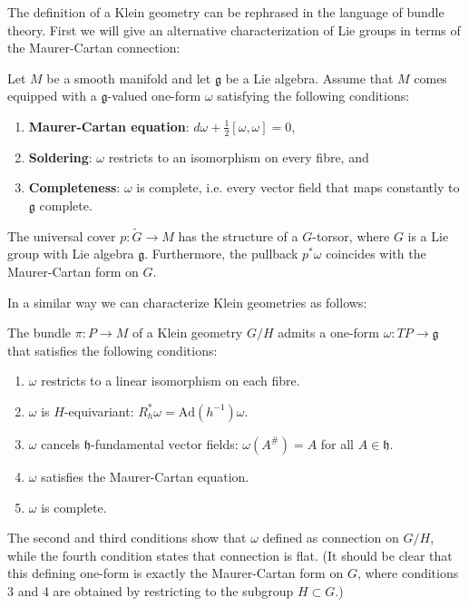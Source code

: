     The definition of a Klein geometry can be rephrased in the language of bundle theory. First we will give an alternative characterization of Lie groups in terms of the Maurer-Cartan connection:
    \begin{property}
        Let $M$ be a smooth manifold and let $\mathfrak{g}$ be a Lie algebra. Assume that $M$ comes equipped with a $\mathfrak{g}$-valued one-form $\omega$ satisfying the following conditions:
        \begin{enumerate}
            \item \textbf{Maurer-Cartan equation}: $d\omega + \frac{1}{2}[\omega,\omega]=0$,
            \item \textbf{Soldering}: $\omega$ restricts to an isomorphism on every fibre, and
            \item \textbf{Completeness}: $\omega$ is complete, i.e. every vector field that maps constantly to $\mathfrak{g}$ complete.
        \end{enumerate}
        The universal cover $p:\widetilde{G}\rightarrow M$ has the structure of a $G$-torsor, where $G$ is a Lie group with Lie algebra $\mathfrak{g}$. Furthermore, the pullback $p^*\omega$ coincides with the Maurer-Cartan form on $G$.
    \end{property}

    In a similar way we can characterize Klein geometries as follows:
    \begin{property}
        The bundle $\pi:P\rightarrow M$ of a Klein geometry $G/H$ admits a one-form $\omega:TP\rightarrow\mathfrak{g}$ that satisfies the following conditions:
        \begin{enumerate}
            \item $\omega$ restricts to a linear isomorphism on each fibre.
            \item $\omega$ is $H$-equivariant: $R_h^*\omega = \text{Ad}(h^{-1})\omega$.
            \item $\omega$ cancels $\mathfrak{h}$-fundamental vector fields: $\omega(A^\#)=A$ for all $A\in\mathfrak{h}$.
            \item $\omega$ satisfies the Maurer-Cartan equation.
            \item $\omega$ is complete.
        \end{enumerate}
    \end{property}
    The second and third conditions show that $\omega$ defined as connection on $G/H$, while the fourth condition states that connection is flat. (It should be clear that this defining one-form is exactly the Maurer-Cartan form on $G$, where conditions 3 and 4 are obtained by restricting to the subgroup $H\subset G$.)

